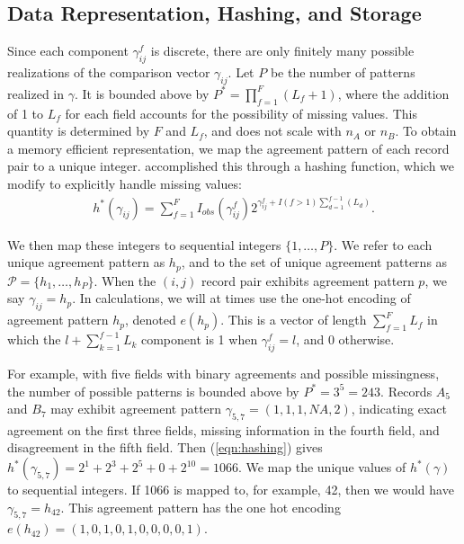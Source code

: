 \documentclass[ba]{imsart}
\begin{document}
\hypertarget{data-representation-hashing-and-storage}{%
	\subsection{Data Representation, Hashing, and
		Storage}\label{data-representation-hashing-and-storage}}
	
Since each component $\gamma_{ij}^f$ is discrete, there are only finitely many possible realizations of the comparison vector $\gamma_{ij}$. Let $P$ be the number of patterns realized in $\gamma$. It is bounded above by $P^{*} =  \prod_{f=1}^F (L_f + 1)$, where the addition of 1 to $L_f$ for each field accounts for the possibility of missing values. This quantity is determined by $F$ and $L_f$, and does not scale with $n_A$ or $n_B$. To obtain a memory efficient representation, we map the agreement pattern of each record pair to a unique integer. \cite{enamorado2019using} accomplished this through a hashing function, which we modify to explicitly handle missing values:
\begin{align}
	\label{eqn:hashing}
	h^{*}(\gamma_{ij}) = \sum_{f = 1}^F I_{obs}(\gamma_{ij}^f)2^{\gamma_{ij}^f + I(f>1)\sum_{d=1}^{f-1}(L_d)}.
\end{align}

We then map these integers to sequential integers $\{1, \ldots, P\}$. We refer to each unique agreement pattern as $h_p$, and to the set of unique agreement patterns as $\mathcal{P} = \{h_1, \ldots, h_P\}$. When the $(i,j)$ record pair exhibits agreement pattern $p$, we say $\gamma_{ij} = h_p$. In calculations, we will at times use the one-hot encoding of agreement pattern $h_p$, denoted $e(h_p)$. This is a vector of length $\sum_{f=1}^F L_f$ in which the $l + \sum_{k=1}^{f-1} L_k$ component is 1 when $\gamma_{ij}^f = l$, and 0 otherwise. 

For example, with five fields with binary agreements and possible missingness, the number of possible patterns is bounded above by $P^{*} = 3^5 = 243$. Records $A_5$ and $B_7$ may exhibit agreement pattern $\gamma_{5,7} = (1, 1, 1, NA, 2)$, indicating exact agreement on the first three fields, missing information in the fourth field, and disagreement in the fifth field. Then (\ref{eqn:hashing}) gives $h^{*}(\gamma_{5,7}) = 2^1 + 2^3 + 2^5 + 0 + 2^{10} = 1066$. We map the unique values of $h^{*}(\gamma)$ to sequential integers. If 1066 is mapped to, for example, 42, then we would have $\gamma_{5,7} = h_{42}.$ This agreement pattern has the one hot encoding $e(h_{42}) = (1, 0, 1, 0, 1, 0, 0, 0, 0, 1)$.
\end{document}
